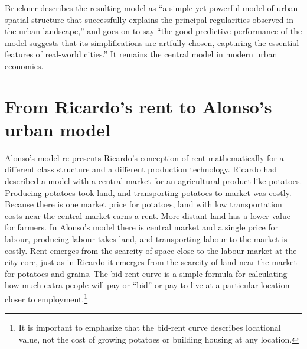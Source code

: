  Bruckner \cite{bruecknerStructureUrbanEquilibria1987} describes the resulting model as ``a simple yet powerful model of urban spatial structure that successfully explains the principal regularities observed in the urban landscape,'' and goes on to say ``the good predictive performance of the model suggests that its simplifications are artfully chosen, capturing the essential features of real-world cities.'' It remains the central model in modern urban economics. 




\section{From Ricardo's rent to Alonso's urban model}

Alonso's model re-presents Ricardo's conception of rent mathematically for a different class structure and a different production technology. Ricardo had described a model with a central market for an agricultural product like potatoes. Producing potatoes took land, and transporting potatoes to market was costly. Because there is one market price for potatoes, land with low transportation costs near the central market earns a rent. More distant land has a lower value for farmers. In Alonso's model there is central market and a single price for labour, producing labour takes land, and transporting labour to the market is costly. Rent emerges from the scarcity of space close to the labour market at the city core, just as  in Ricardo it emerges from the scarcity of land near the market for potatoes and grains. The \gls{bid-rent curve} is a simple formula for calculating how much extra people will pay or ``bid'' or pay to live at a particular location closer to employment.\footnote{It is important to emphasize that the bid-rent curve describes  locational value, not the cost of growing potatoes or building housing at any location.}   

